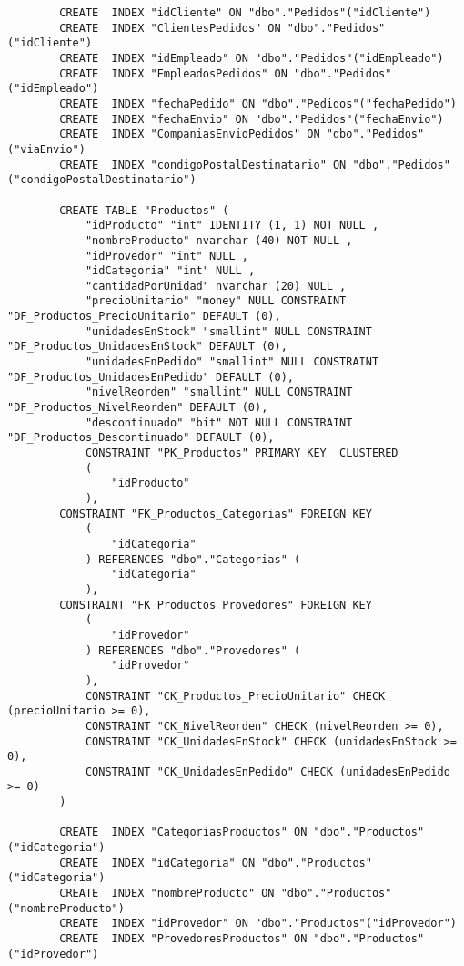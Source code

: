\documentclass[12pt, letterpaper]{article}
\begin{document}
{\begin{lstlisting}
        CREATE  INDEX "idCliente" ON "dbo"."Pedidos"("idCliente")
        CREATE  INDEX "ClientesPedidos" ON "dbo"."Pedidos"("idCliente")
        CREATE  INDEX "idEmpleado" ON "dbo"."Pedidos"("idEmpleado")
        CREATE  INDEX "EmpleadosPedidos" ON "dbo"."Pedidos"("idEmpleado")
        CREATE  INDEX "fechaPedido" ON "dbo"."Pedidos"("fechaPedido")
        CREATE  INDEX "fechaEnvio" ON "dbo"."Pedidos"("fechaEnvio")
        CREATE  INDEX "CompaniasEnvioPedidos" ON "dbo"."Pedidos"("viaEnvio")
        CREATE  INDEX "condigoPostalDestinatario" ON "dbo"."Pedidos"("condigoPostalDestinatario")

        CREATE TABLE "Productos" (
            "idProducto" "int" IDENTITY (1, 1) NOT NULL ,
            "nombreProducto" nvarchar (40) NOT NULL ,
            "idProvedor" "int" NULL ,
            "idCategoria" "int" NULL ,
            "cantidadPorUnidad" nvarchar (20) NULL ,
            "precioUnitario" "money" NULL CONSTRAINT "DF_Productos_PrecioUnitario" DEFAULT (0),
            "unidadesEnStock" "smallint" NULL CONSTRAINT "DF_Productos_UnidadesEnStock" DEFAULT (0),
            "unidadesEnPedido" "smallint" NULL CONSTRAINT "DF_Productos_UnidadesEnPedido" DEFAULT (0),
            "nivelReorden" "smallint" NULL CONSTRAINT "DF_Productos_NivelReorden" DEFAULT (0),
            "descontinuado" "bit" NOT NULL CONSTRAINT "DF_Productos_Descontinuado" DEFAULT (0),
            CONSTRAINT "PK_Productos" PRIMARY KEY  CLUSTERED
            (
                "idProducto"
            ),
        CONSTRAINT "FK_Productos_Categorias" FOREIGN KEY
            (
                "idCategoria"
            ) REFERENCES "dbo"."Categorias" (
                "idCategoria"
            ),
        CONSTRAINT "FK_Productos_Provedores" FOREIGN KEY
            (
                "idProvedor"
            ) REFERENCES "dbo"."Provedores" (
                "idProvedor"
            ),
            CONSTRAINT "CK_Productos_PrecioUnitario" CHECK (precioUnitario >= 0),
            CONSTRAINT "CK_NivelReorden" CHECK (nivelReorden >= 0),
            CONSTRAINT "CK_UnidadesEnStock" CHECK (unidadesEnStock >= 0),
            CONSTRAINT "CK_UnidadesEnPedido" CHECK (unidadesEnPedido >= 0)
        )

        CREATE  INDEX "CategoriasProductos" ON "dbo"."Productos"("idCategoria")
        CREATE  INDEX "idCategoria" ON "dbo"."Productos"("idCategoria")
        CREATE  INDEX "nombreProducto" ON "dbo"."Productos"("nombreProducto")
        CREATE  INDEX "idProvedor" ON "dbo"."Productos"("idProvedor")
        CREATE  INDEX "ProvedoresProductos" ON "dbo"."Productos"("idProvedor")


\end{lstlisting}}
\end{document}
